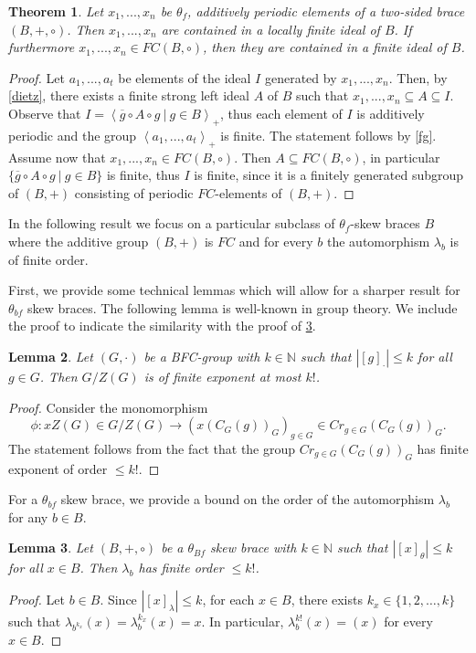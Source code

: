 \documentclass{amsart}
\newcommand{\N}{\mathbb{N}}
\newtheorem{thm}{Theorem}[section]
\newtheorem{lem}[thm]{Lemma}
\begin{document}
\begin{thm}
    Let $x_1,...,x_n$ be $\theta_f$, additively periodic elements of a two-sided brace $(B,+,\circ)$. Then $x_1,...,x_n$ are contained in a locally finite ideal of $B$. If furthermore $x_1,...,x_n \in FC(B,\circ)$, then they are contained in a finite ideal of $B$.
\end{thm}
\begin{proof}
    Let $a_1,...,a_t$ be elements of the ideal $I$ generated by $x_1,...,x_n$. Then, by \cref{dietz}, there exists a finite strong left ideal $A$ of $B$ such that $x_1,...,x_n\subseteq A\subseteq I$. Observe that $I=\left<\overline{g}   \circ A\circ g \ | \ g\in B\right>_+$, thus each element of $I$ is additively periodic and the group $\left<a_1,...,a_t\right>_+$ is finite. The statement follows by \cref{fg}. Assume now that $x_1,...,x_n \in FC(B,\circ)$. Then $A\subseteq FC(B,\circ)$, in particular $\{\overline{g}\circ A\circ g \ |\ g\in B\}$ is finite, thus $I$ is finite, since it is a finitely generated subgroup of $(B,+)$ consisting of periodic $FC$-elements of $(B,+)$.
\end{proof}


In the following result we focus on a particular subclass of $\theta_f$-skew braces $B$ where the additive group $(B,+)$ is $FC$ and for every $b$ the automorphism $\lambda_b$ is of finite order. 

First, we provide some technical lemmas which will allow for a sharper result for $\theta_{bf}$ skew braces. The following lemma is well-known in group theory. We include the proof to indicate the similarity with the proof of  \cref{order of lambda for theta Bf}.

\begin{lem}
\label{BFC -> G/Z has finite exp}
    Let $(G,\cdot)$ be a BFC-group with $k\in\N$ such that
    $|[g]_\cdot|\leq k$ for all $g\in G$.
    Then $G/Z(G)$ is of finite exponent at most $k!$.
\end{lem}
\begin{proof}
    Consider the monomorphism $$\phi:xZ(G)\in G/Z(G)\to (x(C_G(g))_G)_{g\in G}\in Cr_{g\in G}(C_G(g))_G.$$ The statement follows from the fact that the group $Cr_{g\in G}(C_G(g))_G$ has finite exponent of order $\leq k!$.
\end{proof}

For a $\theta_{bf}$ skew brace, we provide a bound on the order of the automorphism $\lambda_b$ for any $b \in B$.

\begin{lem}
\label{order of lambda for theta Bf}
    Let $(B,+,\circ)$ be a $\theta_{Bf}$ skew brace
    with $k\in\N$ such that
    $|[x]_\theta|\leq k$ for all $x\in B$.
    Then $\lambda_b$ has finite order $\leq k!$.
\end{lem}
\begin{proof}
  Let $b\in B$. Since $|[x]_\lambda|\leq k$, 
  for each $x\in B$,
  there exists $k_x\in\{1,2,\dots, k\}$ such that
  $\lambda_{b^{k_x}}(x)=\lambda^{k_x}_b(x)=x$.
  In particular, $\lambda^{k!}_b(x)=(x)$ for every $x\in B$.
\end{proof}
\end{document}
